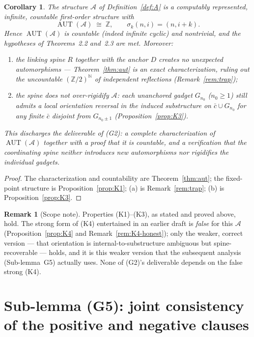 \documentclass[12pt,fullpage]{article}
\newtheorem{corollary}[theorem]{Corollary}
\theoremstyle{definition}
\newtheorem{remark}[theorem]{Remark}
\newcommand{\A}{\mathcal{A}}
\newcommand{\N}{\mathbb{N}}
\newcommand{\Z}{{\mathbb{Z}}}
\newcommand{\AUT}{\operatorname{AUT}}
\begin{document}
\begin{corollary}\label{cor:G2}
The structure $\A$ of Definition~\ref{def:A} is a computably represented,
infinite, countable first-order structure with
\[
\AUT(\A)\;\cong\;\Z,\qquad \sigma_k(n,i)=(n,i+k).
\]
Hence $\AUT(\A)$ is countable (indeed infinite cyclic) and nontrivial, and the
hypotheses of Theorems~2.2 and~2.3 are met.  Moreover:
\begin{enumerate}[label=(\alph*)]
\item the linking spine $R$ together with the anchor $D$ creates \emph{no}
  unexpected automorphisms --- Theorem~\ref{thm:aut} is an \emph{exact}
  characterization, ruling out the uncountable $(\Z/2)^{\N}$ of independent
  reflections (Remark~\ref{rem:trap});
\item the spine does \emph{not} over-rigidify $\A$: each unanchored gadget
  $G_{n_0}$ ($n_0\ge1$) still admits a local orientation reversal in the
  induced substructure on $\bar c\cup G_{n_0}$ for any finite $\bar c$
  disjoint from $G_{n_0\pm1}$ (Proposition~\ref{prop:K3}).
\end{enumerate}
This discharges the deliverable of (G2): a complete characterization of
$\AUT(\A)$ together with a proof that it is countable, and a verification that
the coordinating spine neither introduces new automorphisms nor rigidifies the
individual gadgets.
\end{corollary}

\begin{proof}
The characterization and countability are Theorem~\ref{thm:aut}; the
fixed-point structure is Proposition~\ref{prop:K1}; (a) is
Remark~\ref{rem:trap}; (b) is Proposition~\ref{prop:K3}.
\end{proof}

\begin{remark}[Scope note]\label{rem:G2-scope}
Properties (K1)--(K3), as stated and proved above, hold.  The
strong form of (K4) entertained in an earlier draft is \emph{false} for this
$\A$ (Proposition~\ref{prop:K4} and Remark~\ref{rem:K4-honest}); only the
weaker, correct version --- that orientation is internal-to-substructure
ambiguous but spine-recoverable --- holds, and it is this weaker version that
the subsequent analysis (Sub-lemma~G5) actually uses.  None of (G2)'s
deliverable depends on the false strong (K4).
\end{remark}


\section*{Sub-lemma (G5): joint consistency of the positive and negative clauses}
\end{document}

